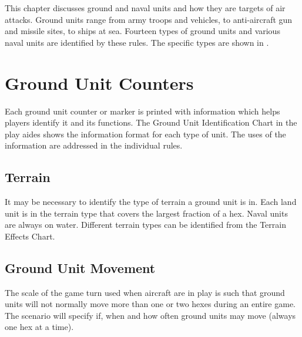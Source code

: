 


This chapter discusses ground and naval units and how they are targets of air attacks. Ground units range from army troops and vehicles, to anti-aircraft gun and missile sites, to ships at sea. Fourteen types of ground units and various naval units are identified by these rules. The specific types are shown in .

\section{Ground Unit Counters}

Each ground unit counter or marker is printed with information which helps players identify it and its functions. The Ground Unit Identification Chart in the play aides shows the information format for each type of unit. The uses of the information are addressed in the individual rules.

\subsection{Terrain} It may be necessary to identify the type of terrain a ground unit is in. Each land unit is in the terrain type that covers the largest fraction of a hex. Naval units are always on water. Different terrain types can be identified from the Terrain Effects Chart.

\subsection{Ground Unit Movement} The scale of the game turn used when aircraft are in play is such that ground units will not normally move more than one or two hexes during an entire game. The scenario will specify if, when and how often ground units may move (always one hex at a time).

